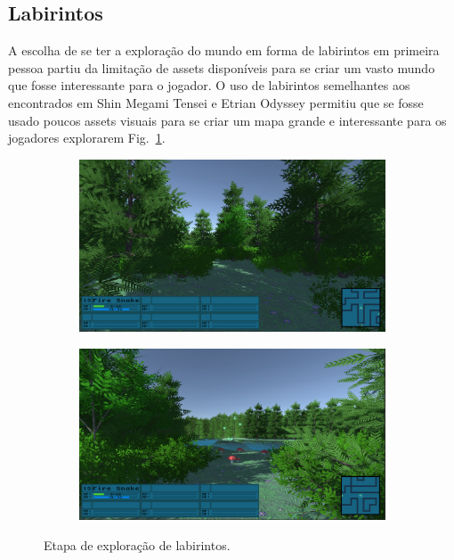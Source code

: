 \documentclass[
	12pt,				%
	openright,			%
	twoside,			%
	a4paper,			%
	english,			%
	french,				%
	spanish,			%
	brazil				%
	]{abntex2}
\begin{document}
\subsection{Labirintos}

A escolha de se ter a exploração do mundo em forma de labirintos em primeira pessoa partiu da limitação de assets disponíveis para se criar um vasto mundo que fosse interessante para o jogador. O uso de labirintos semelhantes aos encontrados em Shin Megami Tensei e Etrian Odyssey permitiu que se fosse usado poucos assets visuais para se criar um mapa grande e interessante para os jogadores explorarem Fig.~\ref{fig:jogo1}.

\begin{figure}[h!]
  \centering
  \begin{subfigure}[b]{0.4\linewidth}
    \includegraphics[width=\linewidth]{lab1.jpg}
  \end{subfigure}
  \begin{subfigure}[b]{0.4\linewidth}
    \includegraphics[width=\linewidth]{lab2.jpg}
  \end{subfigure}
  \caption{Etapa de exploração de labirintos.}
  \label{fig:jogo1}
\end{figure}
\end{document}
